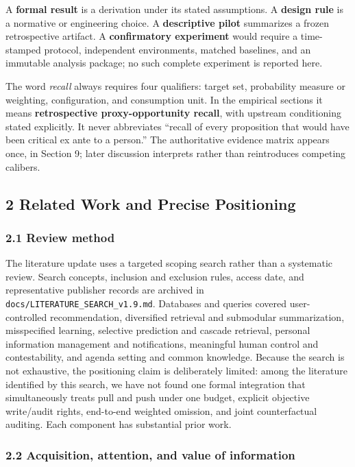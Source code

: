\documentclass[
  11pt]{article}
\begin{document}
A \textbf{formal result} is a derivation under its stated assumptions. A
\textbf{design rule} is a normative or engineering choice. A
\textbf{descriptive pilot} summarizes a frozen retrospective artifact. A
\textbf{confirmatory experiment} would require a time-stamped protocol,
independent environments, matched baselines, and an immutable analysis
package; no such complete experiment is reported here.

The word \emph{recall} always requires four qualifiers: target set,
probability measure or weighting, configuration, and consumption unit.
In the empirical sections it means \textbf{retrospective
proxy-opportunity recall}, with upstream conditioning stated explicitly.
It never abbreviates ``recall of every proposition that would have been
critical ex ante to a person.'' The authoritative evidence matrix
appears once, in Section 9; later discussion interprets rather than
reintroduces competing calibers.

\subsection{2 Related Work and Precise
Positioning}\label{related-work-and-precise-positioning}

\subsubsection{2.1 Review method}\label{review-method}

The literature update uses a targeted scoping search rather than a
systematic review. Search concepts, inclusion and exclusion rules,
access date, and representative publisher records are archived in
\texttt{docs/LITERATURE\_SEARCH\_v1.9.md}. Databases and queries covered
user-controlled recommendation, diversified retrieval and submodular
summarization, misspecified learning, selective prediction and cascade
retrieval, personal information management and notifications, meaningful
human control and contestability, and agenda setting and common
knowledge. Because the search is not exhaustive, the positioning claim
is deliberately limited: among the literature identified by this search,
we have not found one formal integration that simultaneously treats pull
and push under one budget, explicit objective write/audit rights,
end-to-end weighted omission, and joint counterfactual auditing. Each
component has substantial prior work.

\subsubsection{2.2 Acquisition, attention, and value of
information}\label{acquisition-attention-and-value-of-information}
\end{document}
